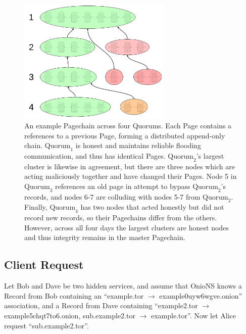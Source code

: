 \begin{figure}[htbp]
	\centering
	\includegraphics[width=0.65\textwidth]{images/LucidCharts/Page-chain.png}
	\caption{An example Pagechain across four Quorums. Each Page contains a references to a previous Page, forming a distributed append-only chain. $ \mathrm{Quorum}_{1} $ is honest and maintains reliable flooding communication, and thus has identical Pages. $ \mathrm{Quorum}_{2} $'s largest cluster is likewise in agreement, but there are three nodes which are acting maliciously together and have changed their Pages. Node 5 in $ \mathrm{Quorum}_{3} $ references an old page in attempt to bypass $ \mathrm{Quorum}_{2} $'s records, and nodes 6-7 are colluding with nodes 5-7 from $ \mathrm{Quorum}_{2} $. Finally, $ \mathrm{Quorum}_{4} $ has two nodes that acted honestly but did not record new records, so their Pagechains differ from the others. However, across all four days the largest clusters are honest nodes and thus integrity remains in the master Pagechain.}
	\label{fig:sidechains}
\end{figure}

\subsection{Client Request}
\label{sec:ClientRequest}


Let Bob and Dave be two hidden services, and assume that OnioNS knows a Record from Bob containing an ``example.tor $ \rightarrow $ example0uyw6wgve.onion'' association, and a Record from Dave containing ``example2.tor $ \rightarrow $ example5chqt7to6.onion, sub.example2.tor $ \rightarrow $ example.tor''. Now let Alice request ``sub.example2.tor''.

